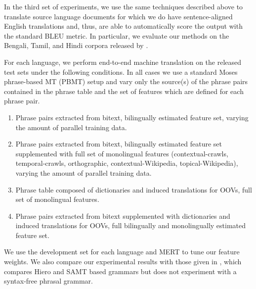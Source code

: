 \documentclass[11pt]{article}
\begin{document}
In the third set of experiments, we use the same techniques described above to translate source language documents for which we do have sentence-aligned English translations and, thus, are able to automatically score the output with the standard BLEU metric. In particular, we evaluate our methods on the Bengali, Tamil, and Hindi corpora released by .

For each language, we perform end-to-end machine translation on the released test sets under the following conditions. In all cases we use a standard Moses phrase-based MT (PBMT) setup and vary only the source(s) of the phrase pairs contained in the phrase table and the set of features which are defined for each phrase pair.
\begin{enumerate}
\item{Phrase pairs extracted from bitext, bilingually estimated feature set, varying the amount of parallel training data.}
\item{Phrase pairs extracted from bitext, bilingually estimated feature set supplemented with full set of monolingual features (contextual-crawls, temporal-crawls, orthographic, contextual-Wikipedia, topical-Wikipedia), varying the amount of parallel training data. }
\item{Phrase table composed of dictionaries and induced translations for OOVs, full set of monolingual features.}
\item{Phrase pairs extracted from bitext supplemented with dictionaries and induced translations for OOVs, full bilingually and monolingually estimated feature set.}
\end{enumerate}
We use the development set for each language and MERT to tune our feature weights. We also compare our experimental results with those given in , which compares Hiero and SAMT based grammars but does not experiment with a syntax-free phrasal grammar. 

\end{document}
